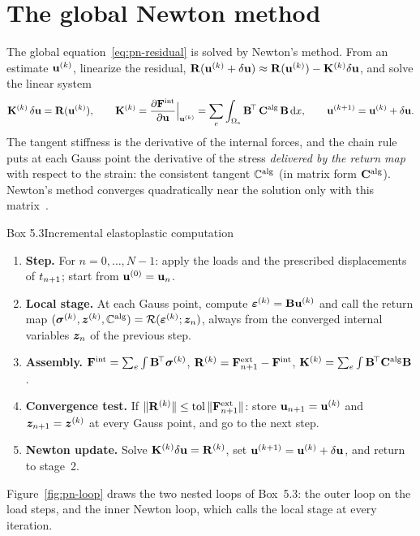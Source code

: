 \section{The global Newton method}\label{sec:pn-newton}
%
The global equation~\eqref{eq:pn-residual} is solved by Newton's method. From
an estimate $\mathbf{u}^{(k)}$, linearize the residual,
$\mathbf{R}(\mathbf{u}^{(k)}+\delta\mathbf{u})\approx\mathbf{R}(\mathbf{u}^{(k)})-\mathbf{K}^{(k)}\delta\mathbf{u}$,
and solve the linear system
\begin{equation}\label{eq:pn-newton}
  \mathbf{K}^{(k)}\,\delta\mathbf{u}=\mathbf{R}(\mathbf{u}^{(k)}),\qquad
  \mathbf{K}^{(k)}=\frac{\partial\mathbf{F}^{\mathrm{int}}}{\partial\mathbf{u}}\Bigr|_{\mathbf{u}^{(k)}}
  =\sum_e\int_{\Omega_e}\mathbf{B}^{\!\top}\,\mathbf{C}^{\mathrm{alg}}\,\mathbf{B}\,\mathrm{d} x,
  \qquad \mathbf{u}^{(k+1)}=\mathbf{u}^{(k)}+\delta\mathbf{u} .
\end{equation}
The tangent stiffness is the derivative of the internal forces, and the chain
rule puts at each Gauss point the derivative of the stress \emph{delivered by
the return map} with respect to the strain: the consistent tangent $\mathbb{C}^{\mathrm{alg}}$
(in matrix form $\mathbf{C}^{\mathrm{alg}}$). Newton's method converges
quadratically near the solution only with this matrix~\cite{SimoTaylor1985}.

\begin{gbox}{Box 5.3\quad Incremental elastoplastic computation}
%
\begin{enumerate}[label=\textbf{\arabic*.},leftmargin=1.6em]
  \item \textbf{Step.} For $n=0,\dots,N-1$: apply the loads and the prescribed
  displacements of $t_{n+1}$; start from $\mathbf{u}^{(0)}=\mathbf{u}_n$.
  \item \textbf{Local stage.} At each Gauss point, compute
  $\bm{\varepsilon}^{(k)}=\mathbf{B}\mathbf{u}^{(k)}$ and call the return map
  $(\bm{\sigma}^{(k)},\bm{z}^{(k)},\mathbb{C}^{\mathrm{alg}})=\mathcal R(\bm{\varepsilon}^{(k)};\bm{z}_n)$, always from the
  converged internal variables $\bm{z}_n$ of the previous step.
  \item \textbf{Assembly.}
  $\mathbf{F}^{\mathrm{int}}=\sum_e\int\mathbf{B}^{\!\top}\bm{\sigma}^{(k)}$, $\mathbf{R}^{(k)}=\mathbf{F}^{\mathrm{ext}}_{n+1}-\mathbf{F}^{\mathrm{int}}$,
  $\mathbf{K}^{(k)}=\sum_e\int\mathbf{B}^{\!\top}\mathbf{C}^{\mathrm{alg}}\mathbf{B}$.
  \item \textbf{Convergence test.} If $\lVert \mathbf{R}^{(k)}\rVert\le\mathrm{tol}\,\lVert \mathbf{F}^{\mathrm{ext}}_{n+1}\rVert$:
  store $\mathbf{u}_{n+1}=\mathbf{u}^{(k)}$ and $\bm{z}_{n+1}=\bm{z}^{(k)}$ at every Gauss
  point, and go to the next step.
  \item \textbf{Newton update.} Solve $\mathbf{K}^{(k)}\delta\mathbf{u}=\mathbf{R}^{(k)}$,
  set $\mathbf{u}^{(k+1)}=\mathbf{u}^{(k)}+\delta\mathbf{u}$, and return to stage~2.
\end{enumerate}
\end{gbox}
\noindent Figure~\ref{fig:pn-loop} draws the two nested loops of Box~5.3: the
outer loop on the load steps, and the inner Newton loop, which calls the local
stage at every iteration.

